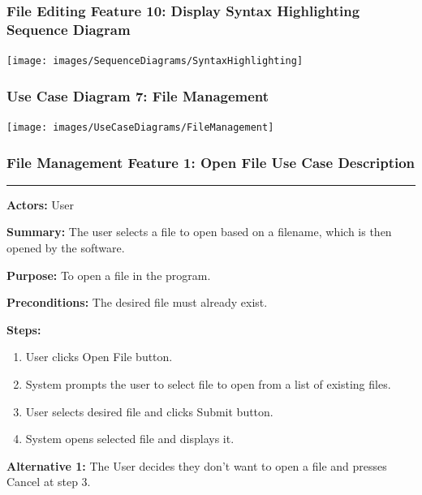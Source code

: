 \documentclass[twoside,letterpaper]{article}
\begin{document}
\subsubsection[File Editing Feature 10: Display Syntax Highlighting Sequence Diagram]{\rmfamily\bfseries\color{black}
	File Editing Feature 10: Display Syntax Highlighting Sequence Diagram}
\hypertarget{RefHeading22059017292}{}

\bigskip

\texttt{[image: images/SequenceDiagrams/SyntaxHighlighting]}

\newpage


\subsubsection[Use Case Diagram 7: File Management]{\rmfamily\bfseries\color{black}
	Use Case Diagram 7: File Management}
\hypertarget{RefHeading22059017292}{}

\texttt{[image: images/UseCaseDiagrams/FileManagement]}

\newpage

\subsubsection[File Management Feature 1: Open File Use Case Description]{\rmfamily\bfseries\color{black}
	File Management Feature 1: Open File Use Case Description}
\hypertarget{RefHeading22059017292}{}

\vspace{2pt}
\hrule
\vspace{8pt}
\textbf{Actors:} User \newline

\noindent\textbf{Summary:} The user selects a file to open based on a filename, which is then opened by the software. \newline

\noindent\textbf{Purpose:} To open a file in the program. \newline

\noindent\textbf{Preconditions:} The desired file must already exist. \newline

\noindent\textbf{Steps:}
\begin{enumerate}
	\item User clicks Open File button.
	\item System prompts the user to select file to open from a list of existing files.
	\item User selects desired file and clicks Submit button.
	\item System opens selected file and displays it.
\end{enumerate}
\noindent\textbf{Alternative 1:} The User decides they don't want to open a file and presses Cancel at step 3. \newline
\end{document}
